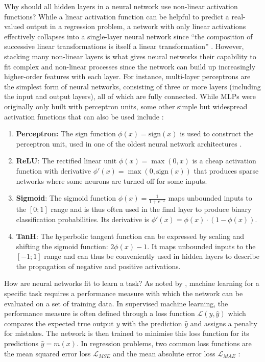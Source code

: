 \noindent Why should all hidden layers in a neural network use non-linear activation functions? While a linear activation function can be helpful to predict a real-valued output in a regression problem, a network with only linear activations effectively collapses into a single-layer neural network since ``the composition of successive linear transformations is itself a linear transformation'' \cite[p.~229]{ml-pattern-2006}. However, stacking many non-linear layers is what gives neural networks their capability to fit complex and non-linear processes since the network can build up increasingly higher-order features with each layer. For instance, multi-layer perceptrons are the simplest form of neural networks, consisting of three or more layers (including the input and output layers), all of which are fully connected. While MLPs were originally only built with perceptron units, some other simple but widespread activation functions that can also be used include \cite{activation-functions-2020, machine-learning-1997}:
\begin{enumerate}
    \item \textbf{Perceptron:} The sign function $\phi(x) = \text{sign}(x)$ is used to construct the perceptron unit, used in one of the oldest neural network architectures \cite{perceptron-1943}.
    \item \textbf{ReLU}: The rectified linear unit $\phi(x) = \max(0, x)$ is a cheap activation function with derivative $\phi'(x) = \max(0, \text{sign}(x))$ that produces sparse networks where some neurons are turned off for some inputs.
    \item \textbf{Sigmoid}: The sigmoid function $\phi(x) = \frac{1}{1 + e^{-x}}$ maps unbounded inputs to the $[0; 1]$ range and is thus often used in the final layer to produce binary classification probabilities. Its derivative is $\phi'(x) = \phi(x) \cdot (1 - \phi(x))$.
    \item \textbf{TanH}: The hyperbolic tangent function can be expressed by scaling and shifting the sigmoid function: $2 \phi(x) - 1$. It maps unbounded inputs to the $[-1; 1]$ range and can thus be conveniently used in hidden layers to describe the propagation of negative and positive activations.
\end{enumerate}
\noindent How are neural networks fit to learn a task? As noted by \textcite{machine-learning-1997}, machine learning for a specific task requires a performance measure with which the network can be evaluated on a set of training data. In supervised machine learning, the performance measure is often defined through a loss function $\mathcal{L}(y, \hat{y})$ which compares the expected true output $y$ with the prediction $\hat{y}$ and assigns a penalty for mistakes. The network is then trained to minimise this loss function for its predictions $\hat{y} = m(x)$. In regression problems, two common loss functions are the mean squared error loss $\mathcal{L}_{MSE}$ and the mean absolute error loss $\mathcal{L}_{MAE}$ \cite{ml-pattern-2006, mae-rmse-2005}:
